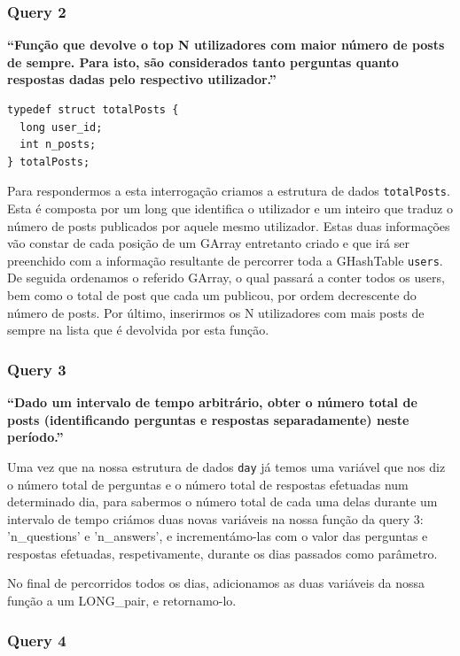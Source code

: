 \documentclass[a4paper]{article}
\begin{document}
\subsubsection*{Query 2}
\label{sec:query2}

\textbf{“Função que devolve o top N utilizadores com maior número
de posts de sempre. Para isto, são considerados tanto perguntas
quanto respostas dadas pelo respectivo utilizador.”}

\begin{verbatim}
typedef struct totalPosts {
  long user_id;
  int n_posts;
} totalPosts;
\end{verbatim}

Para respondermos a esta interrogação criamos a estrutura de dados
\texttt{totalPosts}. Esta é composta por um long que identifica o utilizador e um inteiro
que traduz o número de posts publicados por aquele mesmo utilizador.
Estas duas informações vão constar de cada posição de um GArray entretanto criado
e que irá ser preenchido com a informação resultante de percorrer
toda a GHashTable \texttt{users}.
De seguida ordenamos o referido GArray, o qual passará a conter todos os users,
bem como o total de post que cada um publicou, por ordem decrescente do número de posts.
Por último, inserirmos os N utilizadores com
mais posts de sempre na lista que é devolvida por esta função.

\subsubsection*{Query 3}
\label{sec:query3}

\textbf{“Dado um intervalo de tempo arbitrário,
obter o número total de posts (identificando perguntas e respostas separadamente) neste período.”}

Uma vez que na nossa estrutura de dados \texttt{day} já temos uma variável que nos diz o número total de perguntas
e o número total de respostas efetuadas num determinado dia, para sabermos o
número total de cada uma delas durante um intervalo de tempo criámos duas novas
variáveis na nossa função da query 3: \textsf{'n\_questions'} e \textsf{'n\_answers'},
e incrementámo-las com o valor das perguntas e respostas efetuadas, respetivamente,
durante os dias passados como parâmetro.

No final de percorridos todos os dias, adicionamos as duas variáveis da nossa função a um LONG\_pair, e retornamo-lo.


\subsubsection*{Query 4}
\label{sec:query4}
\end{document}
